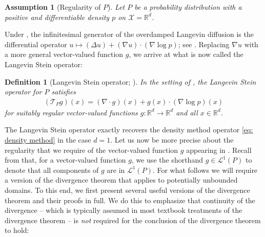 \documentclass[12pt,paper=letter]{scrreprt}
\newtheorem{definition}{Definition}[chapter]
\def\reals{\mathbb{R}} %
\newtheorem{assumption}{Assumption}[chapter]
\newcommand{\TP}{\mathcal{T}_P}
\newcommand{\Lp}[1][p]{\mathcal{L}^{#1}}
\begin{document}
\begin{assumption}[Regularity of $P$]
\label{ass: reg langevin}
    Let $P$ be a probability distribution with a positive and differentiable density $p$ on $\mathcal{X} = \reals^d$.
\end{assumption}

Under , the infinitesimal generator of the overdamped Langevin diffusion is the differential operator $u \mapsto (\Delta u) + (\nabla u) \cdot (\nabla \log p)$; see .
Replacing $\nabla u$ with a more general vector-valued function $g$, we arrive at what is now called the Langevin Stein operator:

\begin{definition}[Langevin Stein operator; \citealp{gorham2015measuring}]
\label{def: Lang SO}
In the setting of , the \emph{Langevin Stein operator} for $P$ satisfies
\begin{align}
(\TP g)(x) = (\nabla \cdot g)(x) + g(x) \cdot (\nabla \log p)(x) \label{eq: Lang SO}
\end{align}
for suitably regular vector-valued functions $g: \reals^d \to \reals^d$ and all $x \in \reals^d$.
\end{definition}

\noindent The Langevin Stein operator exactly recovers the density method operator \cref{eq: density method} in the case $d = 1$.
Let us now be more precise about the regularity that we require of the vector-valued function $g$ appearing in .
Recall from  that, for a vector-valued function $g$, we use the shorthand $g \in \Lp[1](P)$ to denote that all components of $g$ are in $\Lp[1](P)$.
For what follows we will require a version of the divergence theorem that applies to potentially unbounded domains.
To this end, we first present several useful versions of the divergence theorem and their proofs in full.
We do this to emphasize that continuity of the divergence -- which is typically assumed in most textbook treatments of the divergence theorem -- is \emph{not} required for the conclusion of the divergence theorem to hold:
\end{document}
